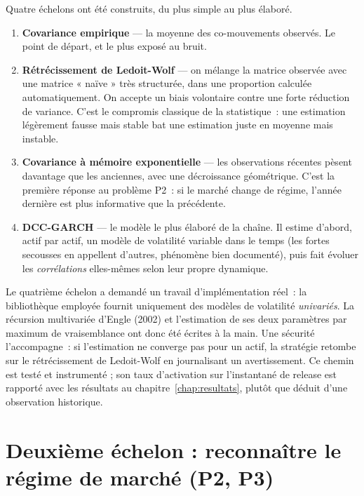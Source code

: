 Quatre échelons ont été construits, du plus simple au plus élaboré.

\begin{enumerate}
  \item \textbf{Covariance empirique} — la moyenne des co-mouvements observés.
        Le point de départ, et le plus exposé au bruit.
  \item \textbf{Rétrécissement de Ledoit-Wolf} — on mélange la matrice observée
        avec une matrice « naïve » très structurée, dans une proportion
        calculée automatiquement. On accepte un biais volontaire contre une
        forte réduction de variance. C'est le compromis classique de la
        statistique~: une estimation légèrement fausse mais stable bat une
        estimation juste en moyenne mais instable.
  \item \textbf{Covariance à mémoire exponentielle} — les observations récentes
        pèsent davantage que les anciennes, avec une décroissance géométrique.
        C'est la première réponse au problème P2~: si le marché change de
        régime, l'année dernière est plus informative que la précédente.
  \item \textbf{DCC-GARCH} — le modèle le plus élaboré de la chaîne. Il estime
        d'abord, actif par actif, un modèle de volatilité variable dans le
        temps (les fortes secousses en appellent d'autres, phénomène bien
        documenté), puis fait évoluer les \emph{corrélations} elles-mêmes selon
        leur propre dynamique.
\end{enumerate}

\begin{remarquebox}
Le quatrième échelon a demandé un travail d'implémentation réel~: la
bibliothèque employée fournit uniquement des modèles de volatilité
\emph{univariés}. La récursion multivariée d'Engle (2002) et l'estimation de ses
deux paramètres par maximum de vraisemblance ont donc été écrites à la main. Une
sécurité l'accompagne~: si l'estimation ne converge pas pour un actif, la
stratégie retombe sur le rétrécissement de Ledoit-Wolf en journalisant un
avertissement. Ce chemin est testé et instrumenté ; son taux d'activation sur
l'instantané de release est rapporté avec les résultats au
chapitre~\ref{chap:resultats}, plutôt que déduit d'une observation historique.
\end{remarquebox}

\section{Deuxième échelon : reconnaître le régime de marché (P2, P3)}

